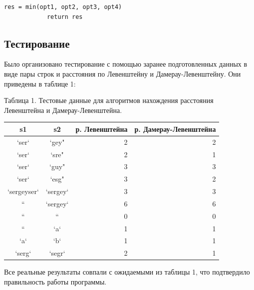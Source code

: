 \documentclass[a4paper, 14pt]{article}
\begin{document}
\begin{center}
\begin{flushleft}
\begin{lstlisting}[label=some-code,caption=Функция нахождения расстояния Дамерау-Левенштейна рекурсивно]
			res = min(opt1, opt2, opt3, opt4)
			return res
        \end{lstlisting}
		\end{flushleft}
        
		\newpage
		
        \subsection{Тестирование}
        \begin{flushleft}
        \parindent=1cm
        Было организовано тестирование с помощью заранее подготовленных данных в виде пары строк и расстояния по Левенштейну и Дамерау-Левенштейну. Они приведены в таблице 1:\\
        	\begin{center}
  	Таблица 1. Тестовые данные для алгоритмов нахождения расстояния Левенштейна и Дамерау-Левенштейна.\\
	\end{center}
        
        \begin{tabular}{ | c | c | r | r | }
        \hline
s1 & s2 & р. Левенштейна & р. Дамерау-Левенштейна \\ \hline
`ser` & `gey" & 2 & 2\\
`ser` & `sre" & 2 & 1\\
`ser` & `guy" & 3 & 3\\
`ser` & `esg" & 3 & 2\\
`sergeyser` & `sergey` & 3 & 3\\
`` & `sergey` & 6 & 6\\
`` & `` & 0 & 0\\
`` & `a` & 1 & 1\\
`a` & `b` & 1 & 1\\
`serg` & `segr` & 2 & 1\\
\hline
        \end{tabular}
	
        Все реальные результаты совпали с ожидаемыми из таблицы 1, что подтвердило правильность работы программы.
                
        \end{flushleft}
    \end{center}
\end{document}
